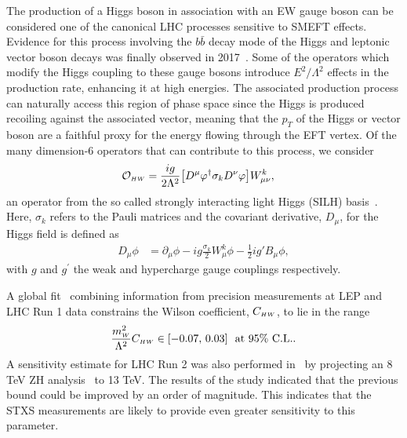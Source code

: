 The production of a Higgs boson in association with an EW gauge boson can be considered one of the canonical LHC processes sensitive to SMEFT effects. Evidence for this process involving the $b\bar{b}$ decay mode of the Higgs and leptonic vector boson decays was finally observed in 2017~\cite{Aaboud:2017xsd,Sirunyan:2017elk}. Some of the operators which modify the Higgs coupling to these gauge bosons introduce $E^2/\Lambda^2$ effects in the production rate, enhancing it at high energies.
The associated production process can naturally access this region of phase space since the Higgs is produced recoiling against the associated vector, meaning that the $p_T$ of the Higgs or vector boson are a faithful proxy for the energy flowing through the EFT vertex. Of the many dimension-6 operators that can contribute to this process, we consider 
\begin{align}
    \mathcal{O}_{\scriptscriptstyle HW} &= 
    \frac{ig}{2\Lambda^2} \big[D^\mu \varphi^\dag \sigma_{k} D^\nu \varphi\big] 
    W^{k}_{\mu \nu},
\end{align}
an operator from the so called strongly interacting light Higgs (SILH) basis~\cite{Giudice:2007fh,Contino:2013kra}. Here, $\sigma_{k}$ refers to the Pauli matrices and the covariant derivative, $D_\mu$, for the Higgs field is defined as
\begin{align}
    D_\mu\phi &= \partial_\mu \phi -  i g \frac{\sigma_{k}}{2} W_\mu^k \phi - \frac12 i g' B_\mu \phi,
\end{align}
with $g$ and $g^\prime$ the weak and hypercharge gauge couplings respectively.

A global fit~\cite{Ellis:2014jta} combining information from precision measurements at LEP and LHC Run 1 data constrains the Wilson coefficient, $C_{\scriptscriptstyle HW}$, to lie in the range 
\begin{align}
    \frac{m_{\scriptscriptstyle W}^2}{\Lambda^2}C_{\scriptscriptstyle HW} \in [-0.07,\,0.03]~\mbox{ at 95\% C.L.}.
\end{align}
A sensitivity estimate for LHC Run 2 was also performed in~\cite{Degrande:2016dqg} by projecting an 8 TeV ZH analysis~\cite{TheATLAScollaboration:2013lia} to 13 TeV. The results of the study indicated that the previous bound could be improved by an order of magnitude. This indicates that the STXS measurements are likely to provide even greater sensitivity to this parameter.

